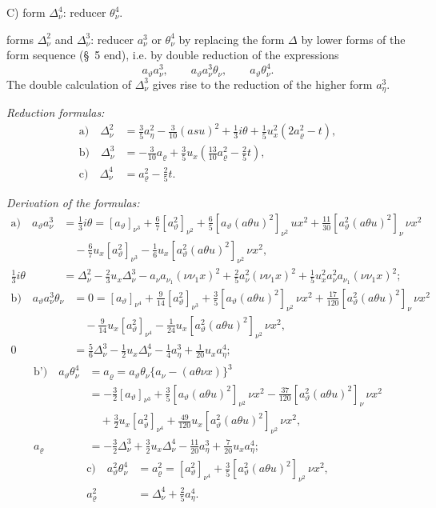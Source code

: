 \documentclass[11pt]{article}
\newcommand{\A}{\Delta}
\newcommand{\R}{\varrho}
\begin{document}
\noindent C) form $\A_\nu^4$: reducer $\theta_\nu^4$.

forms $\A_\nu^2$ and $\A_\nu^3$: reducer $a_\nu^3$ or $\theta_\nu^4$ by replacing the form $\A$ by lower forms of the form sequence (\S\ 5 end), i.e. by double reduction of the expressions
\[
a_\vartheta a_\nu^3,
\qquad a_\vartheta a_\nu^3\theta_\nu,
\qquad a_\vartheta\theta_\nu^4.
\]
The double calculation of $\A_\nu^3$ gives rise to the reduction of the higher form $a_\eta^3$.

\noindent\emph{Reduction formulas:}
\[
\tag{10}
\begin{aligned}
\text{a)}\quad \A_\nu^2
&=\frac35a_\eta^2-\frac3{10}(asu)^2+\frac13 i\theta
+\frac15u_x^2(2a_\R^2-t),\\
\text{b)}\quad \A_\nu^3
&=-\frac3{10}a_\R+\frac35u_x\left(\frac{13}{10}a_\R^2-\frac25t\right),\\
\text{c)}\quad \A_\nu^4&=a_\R^2-\frac25t.
\end{aligned}
\]

\noindent\emph{Derivation of the formulas:}
\[
\begin{aligned}
\text{a)}\quad
 a_\vartheta a_\nu^3
&=\frac13 i\theta
=[a_\vartheta]_{\nu^3}+\frac67[a_\vartheta^2]_{\nu^2}
+\frac65[a_\vartheta(a\theta u)^2]_{\nu^2}\,
u x^2
+\frac{11}{30}[a_\vartheta^2(a\theta u)^2]_\nu\,\nu x^2\\
&\quad-\frac67u_x[a_\vartheta^2]_{\nu^3}
-\frac16u_x[a_\vartheta^2(a\theta u)^2]_{\nu^2}\,\nu x^2,\\
\frac13 i\theta
&=\A_\nu^2-\frac23u_x\A_\nu^3-a_\nu a_{\nu_1}(\nu\nu_1x)^2
+\frac25a_\nu^2(\nu\nu_1x)^2
+\frac15u_x^2a_\nu^2a_{\nu_1}(\nu\nu_1x)^2;
\end{aligned}
\]
\[
\begin{aligned}
\text{b)}\quad
 a_\vartheta a_\nu^3\theta_\nu
&=0=[a_\vartheta]_{\nu^4}+\frac9{14}[a_\vartheta^2]_{\nu^3}
+\frac35[a_\vartheta(a\theta u)^2]_{\nu^2}\,\nu x^2
+\frac{17}{120}[a_\vartheta^2(a\theta u)^2]_{\nu}\,\nu x^2\\
&\quad-\frac9{14}u_x[a_\vartheta^2]_{\nu^4}
-\frac1{24}u_x[a_\vartheta^2(a\theta u)^2]_{\nu^2}\,\nu x^2,\\
0&=\frac56\A_\nu^3-\frac12u_x\A_\nu^4-\frac14a_\eta^3+\frac1{20}u_xa_\eta^4;
\end{aligned}
\]
\[
\begin{aligned}
\text{b')}\quad
 a_\vartheta\theta_\nu^4
&=a_\R=a_\vartheta\theta_\nu\{a_\nu-(a\theta\nu x)\}^3\\
&=-\frac32[a_\vartheta]_{\nu^3}+\frac35[a_\vartheta(a\theta u)^2]_{\nu^2}\,\nu x^2
-\frac{37}{120}[a_\vartheta^2(a\theta u)^2]_{\nu}\,\nu x^2\\
&\quad+\frac32u_x[a_\vartheta^2]_{\nu^4}
+\frac{49}{120}u_x[a_\vartheta^2(a\theta u)^2]_{\nu^2}\,\nu x^2,\\
a_\R&=-\frac32\A_\nu^3+\frac32u_x\A_\nu^4-\frac{11}{20}a_\eta^3+\frac7{20}u_xa_\eta^4;
\end{aligned}
\]
\[
\begin{aligned}
\text{c)}\quad
 a_\vartheta^2\theta_\nu^4
&=a_\R^2=[a_\vartheta^2]_{\nu^4}+\frac35[a_\vartheta^2(a\theta u)^2]_{\nu^2}\,\nu x^2,\\
a_\R^2&=\A_\nu^4+\frac25a_\eta^4.
\end{aligned}
\]
\end{document}
